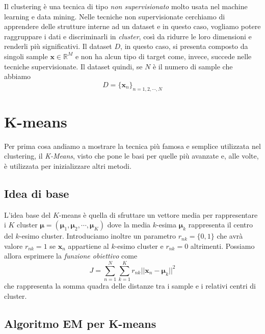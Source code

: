 \documentclass{report}
\begin{document}
Il clustering è una tecnica di tipo \textit{non supervisionato} molto usata nel machine learning e data mining. Nelle tecniche non supervisionate cerchiamo di apprendere delle strutture interne ad un dataset e in questo caso, vogliamo potere raggruppare i dati e discriminarli in \textit{cluster}, così da ridurre le loro dimensioni e renderli più significativi. Il dataset $D$, in questo caso, si presenta composto da singoli sample $\bm{x}\in\mathbb{R}^M$ e non ha alcun tipo di target come, invece, succede nelle tecniche supervisionate. Il dataset quindi, se $N$ è il numero di sample che abbiamo
\begin{equation}
D = \{\bm{x}_n\}_{n=1,2,\cdots,N}
\end{equation}

\section{K-means}

Per prima cosa andiamo a mostrare la tecnica più famosa e semplice utilizzata nel clustering, il \textit{K-Means}, visto che pone le basi per quelle più avanzate e, alle volte, è utilizzata per inizializzare altri metodi.

\subsection{Idea di base}

L'idea base del $K$-means è quella di sfruttare un vettore media per rappresentare i $K$ cluster $\bm\mu = (\bm\mu_1,\bm\mu_2,\cdots,\bm\mu_K)$ dove la media $k$-esima $\bm\mu_k$ rappresenta il centro del $k$-esimo cluster. Introduciamo inoltre un parametro $r_{nk} = \{0,1\}$ che avrà valore $r_{nk} = 1$ se $\bm{x}_n$ appartiene al $k$-esimo cluster e $r_{nk} = 0$ altrimenti. Possiamo allora esprimere la \textit{funzione obiettivo} come
\begin{equation}
J = \sum_{n=1}^{N}\sum_{k=1}^{K}r_{nk}||\bm{x}_n - \bm\mu_k||^2
\end{equation}
che rappresenta la somma quadra delle distanze tra i sample e i relativi centri di cluster.

\subsection{Algoritmo EM per K-means}
\end{document}
